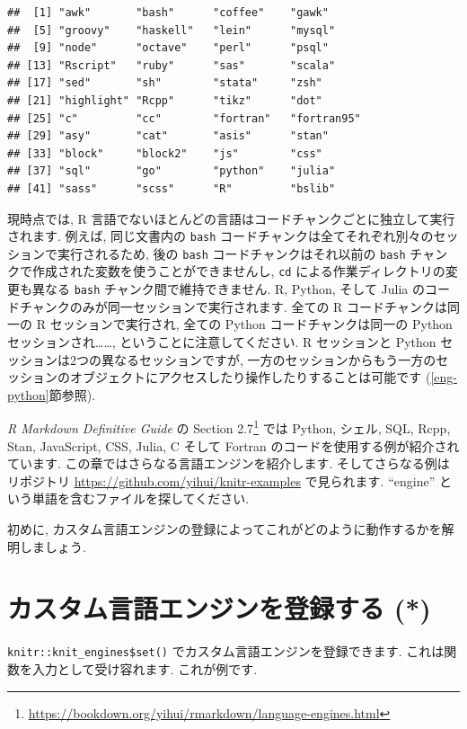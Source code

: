 \documentclass[
  11pt,
  lualatex,ja=standard,jafont=noto]{bxjsreport}
\renewcommand{\href}[2]{#2\footnote{\url{#1}}}
\begin{document}
\begin{verbatim}
##  [1] "awk"       "bash"      "coffee"    "gawk"     
##  [5] "groovy"    "haskell"   "lein"      "mysql"    
##  [9] "node"      "octave"    "perl"      "psql"     
## [13] "Rscript"   "ruby"      "sas"       "scala"    
## [17] "sed"       "sh"        "stata"     "zsh"      
## [21] "highlight" "Rcpp"      "tikz"      "dot"      
## [25] "c"         "cc"        "fortran"   "fortran95"
## [29] "asy"       "cat"       "asis"      "stan"     
## [33] "block"     "block2"    "js"        "css"      
## [37] "sql"       "go"        "python"    "julia"    
## [41] "sass"      "scss"      "R"         "bslib"
\end{verbatim}

現時点では, R 言語でないほとんどの言語はコードチャンクごとに独立して実行されます. 例えば, 同じ文書内の \texttt{bash} コードチャンクは全てそれぞれ別々のセッションで実行されるため, 後の \texttt{bash} コードチャンクはそれ以前の \texttt{bash} チャンクで作成された変数を使うことができませんし, \texttt{cd} による作業ディレクトリの変更も異なる \texttt{bash} チャンク間で維持できません. R, Python, そして Julia のコードチャンクのみが同一セッションで実行されます. 全ての R コードチャンクは同一の R セッションで実行され, 全ての Python コードチャンクは同一の Python セッションされ\ldots\ldots, ということに注意してください. R セッションと Python セッションは2つの異なるセッションですが, 一方のセッションからもう一方のセッションのオブジェクトにアクセスしたり操作したりすることは可能です (\ref{eng-python}節参照).

\emph{R Markdown Definitive Guide} \autocite{rmarkdown2018} の \href{https://bookdown.org/yihui/rmarkdown/language-engines.html}{Section 2.7} では Python, シェル, SQL, Rcpp, Stan, JavaScript, CSS, Julia, C そして Fortran のコードを使用する例が紹介されています. この章ではさらなる言語エンジンを紹介します. そしてさらなる例はリポジトリ \url{https://github.com/yihui/knitr-examples} で見られます. ``engine'' という単語を含むファイルを探してください.

初めに, カスタム言語エンジンの登録によってこれがどのように動作するかを解明しましょう.

\hypertarget{custom-engine}{%
\section{カスタム言語エンジンを登録する (*)}\label{custom-engine}}

\texttt{knitr::knit\_engines\$set()} でカスタム言語エンジンを登録できます. これは関数を入力として受け容れます. これが例です.
\end{document}
